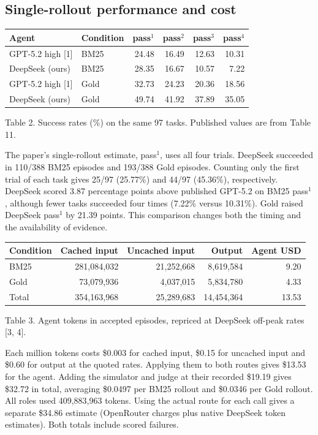 \documentclass{article}
\begin{document}
\subsection{Single-rollout performance and cost}
\begin{center}\small
\begin{tabular}{llrrrr}
\hline Agent & Condition & pass$^1$ & pass$^2$ & pass$^3$ & pass$^4$\\\hline
GPT-5.2 high [1] & BM25 & 24.48 & 16.49 & 12.63 & 10.31\\
DeepSeek (ours) & BM25 & 28.35 & 16.67 & 10.57 & 7.22\\
GPT-5.2 high [1] & Gold & 32.73 & 24.23 & 20.36 & 18.56\\
DeepSeek (ours) & Gold & 49.74 & 41.92 & 37.89 & 35.05\\\hline
\end{tabular}\par
Table 2. Success rates (\%) on the same 97 tasks. Published values are from Table 11.
\end{center}
The paper's single-rollout estimate, pass$^1$, uses all four trials. DeepSeek succeeded in 110/388 BM25 episodes and 193/388 Gold episodes. Counting only the first trial of each task gives 25/97 (25.77\%) and 44/97 (45.36\%), respectively. DeepSeek scored 3.87 percentage points above published GPT-5.2 on BM25 pass$^1$, although fewer tasks succeeded four times (7.22\% versus 10.31\%). Gold raised DeepSeek pass$^1$ by 21.39 points. This comparison changes both the timing and the availability of evidence.

\begin{center}\small
\begin{tabular}{lrrrr}
\hline Condition & Cached input & Uncached input & Output & Agent USD\\\hline
BM25 & 281,084,032 & 21,252,668 & 8,619,584 & 9.20\\
Gold & 73,079,936 & 4,037,015 & 5,834,780 & 4.33\\
Total & 354,163,968 & 25,289,683 & 14,454,364 & 13.53\\\hline
\end{tabular}\par
Table 3. Agent tokens in accepted episodes, repriced at DeepSeek off-peak rates [3, 4].
\end{center}
Each million tokens costs \$0.003 for cached input, \$0.15 for uncached input and \$0.60 for output at the quoted rates. Applying them to both routes gives \$13.53 for the agent. Adding the simulator and judge at their recorded \$19.19 gives \$32.72 in total, averaging \$0.0497 per BM25 rollout and \$0.0346 per Gold rollout. All roles used 409,883,963 tokens. Using the actual route for each call gives a separate \$34.86 estimate (OpenRouter charges plus native DeepSeek token estimates). Both totals include scored failures.
\end{document}
